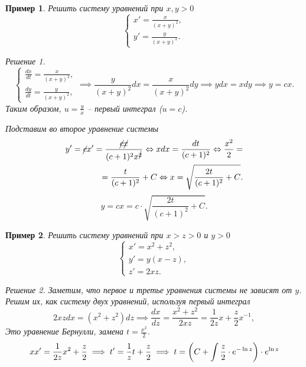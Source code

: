 \documentclass[a5paper, 11pt]{article}
\theoremstyle{definition}
\theoremstyle{plain}
\newtheorem{Ex}{Пример}
\theoremstyle{remark}
\newtheorem*{Solution}{Решение}
\begin{document}
	\begin{Ex}
		Решить систему уравнений при $x,y>0$
		\[
		\begin{cases}
			x' =\frac{x}{(x+y)^2},\\
			y' = \frac{y}{(x+y)^2}.
		\end{cases}
		\]
		\begin{Solution}
			\[
			\begin{cases}
				\frac{dx}{dt}= \frac{x}{(x+y)^2},\\
				\frac{dy}{dt} =  \frac{y}{(x+y)^2},
			\end{cases}
		\implies
			 \frac{y}{(x+y)^2} dx = \frac{x}{(x+y)^2} dy \implies ydx = xdy \implies y = cx.
			\]
			Таким образом, $u = \frac{y}{x}$ --  первый интеграл ($u=c$).
			
			Подставим во второе уравнение системы
			\[
			\begin{split}
			y' = \cancel{c}x' = \frac{\cancel{c}\cancel{x}}{(c+1)^2x^{\cancel{2}}} \Leftrightarrow xdx = \frac{dt}{(c+1)^2} \Leftrightarrow \frac{x^2}{2} =\\
			= \frac{t}{(c+1)^2} + C \Leftrightarrow x = \sqrt{\frac{2t}{(c+1)^2}+C}.
		\end{split}
			\]
			\[
			y = cx = c\cdot \sqrt{\frac{2t}{(c+1)^2}+C}.
			\]
		\end{Solution}
	\end{Ex}
	\begin{Ex}
			Решить систему уравнений при $x>z>0$ и $y>0$
			\[
			\begin{cases}
				x' = x^2 + z^2,\\
				y' = y(x-z),\\
				z' = 2xz.
			\end{cases}
			\]
			\begin{Solution}
				Заметим, что первое и третье уравнения системы не зависят от $y$. Решим их, как систему двух уравнений, используя первый интеграл
				\[
				2xzdx = (x^2+z^2)dz \implies \frac{dx}{dz} = \frac{x^2+z^2}{2xz} = \frac{1}{2z} x + \frac{z}{2}x^{-1},
				\]
				Это уравнение Бернулли, замена $t=\frac{x^2}{2}$.
				\[
				xx' = \frac{1}{2z} x^2 + \frac{z}{2} \implies t' = \frac{1}{z} t + \frac{z}{2} \implies t = \left(C + \int\frac{z}{2} \cdot e^{-\ln z} \right) \cdot e^{\ln z}
				\]
			\end{Solution}
	\end{Ex}
\end{document}

